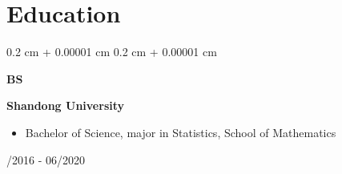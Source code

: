 \documentclass[10pt, letterpaper]{article}
\newenvironment{highlights}{
    \begin{itemize}[
        topsep=0.10 cm,
        parsep=0.10 cm,
        partopsep=0pt,
        itemsep=0pt,
        leftmargin=0.4 cm + 10pt
    ]
}{
    \end{itemize}
} %
\newenvironment{highlightsforbulletentries}{
    \begin{itemize}[
        topsep=0.10 cm,
        parsep=0.10 cm,
        partopsep=0pt,
        itemsep=0pt,
        leftmargin=10pt
    ]
}{
    \end{itemize}
} %
\newenvironment{onecolentry}{
    \begin{adjustwidth}{
        0.2 cm + 0.00001 cm
    }{
        0.2 cm + 0.00001 cm
    }
}{
    \end{adjustwidth}
} %
\newenvironment{threecolentry}[3][]{
    \onecolentry
    \def\thirdColumn{#3}
    \setcolumnwidth{1 cm, \fill, 4.5 cm}
    \begin{paracol}{3}
    {\raggedright #2} \switchcolumn
}{
    \switchcolumn \raggedleft \thirdColumn
    \end{paracol}
    \endonecolentry
} %
\let\hrefWithoutArrow\href
\renewcommand{\href}[2]{\hrefWithoutArrow{#1}{\ifthenelse{\equal{#2}{}}{ }{#2 }\raisebox{.15ex}{\footnotesize \faExternalLink*}}}
\begin{document}



    









    \section{Education}



        
        \begin{threecolentry}{\textbf{BS}}{
            09/2016 - 06/2020
        }
            \textbf{Shandong University}
            \begin{highlights}
                \item Bachelor of Science, major in Statistics, School of Mathematics
            \end{highlights}
        \end{threecolentry}
\end{document}
